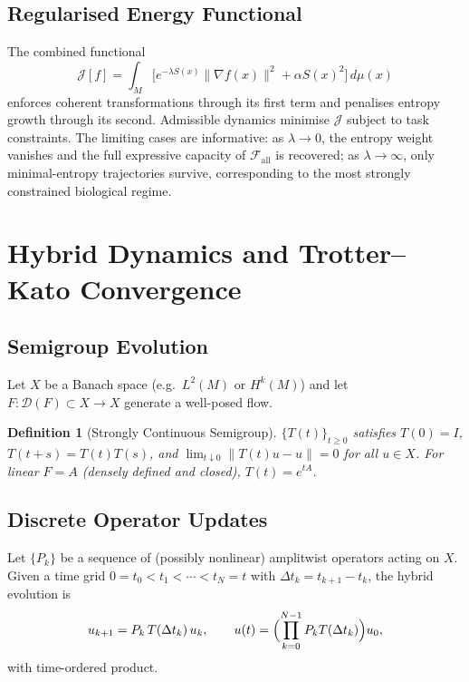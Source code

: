 \documentclass[12pt, a4paper]{article}
\newtheorem{definition}[theorem]{Definition}
\theoremstyle{remark}
\theoremstyle{definition}
\begin{document}
\subsection{Regularised Energy Functional}

The combined functional
\[
\mathcal{J}[f]
= \int_M \bigl[e^{-\lambda S(x)}\|\nabla f(x)\|^2
+ \alpha S(x)^2\bigr]\,d\mu(x)
\]
enforces coherent transformations through its first term and penalises entropy growth
through its second.  Admissible dynamics minimise $\mathcal{J}$ subject to task
constraints.  The limiting cases are informative: as $\lambda \to 0$, the entropy weight
vanishes and the full expressive capacity of $\mathcal{F}_{\mathrm{all}}$ is recovered;
as $\lambda \to \infty$, only minimal-entropy trajectories survive, corresponding to the
most strongly constrained biological regime.

\section{Hybrid Dynamics and Trotter--Kato Convergence}
\label{app:hybrid}

\subsection{Semigroup Evolution}

Let $X$ be a Banach space (e.g.\ $L^2(M)$ or $H^k(M)$) and let $F\colon\mathcal{D}(F)
\subset X \to X$ generate a well-posed flow.

\begin{definition}[Strongly Continuous Semigroup]
$\{T(t)\}_{t\ge 0}$ satisfies $T(0) = I$, $T(t+s) = T(t)T(s)$, and
$\lim_{t\downarrow 0}\|T(t)u - u\| = 0$ for all $u \in X$.
For linear $F = A$ (densely defined and closed), $T(t) = e^{tA}$.
\end{definition}

\subsection{Discrete Operator Updates}

Let $\{P_k\}$ be a sequence of (possibly nonlinear) amplitwist operators acting on $X$.
Given a time grid $0 = t_0 < t_1 < \cdots < t_N = t$ with $\Delta t_k = t_{k+1} - t_k$,
the hybrid evolution is
\[
u_{k+1} = P_k\,T(\Delta t_k)\,u_k, \qquad
u(t) = \Bigl(\prod_{k=0}^{N-1} P_k T(\Delta t_k)\Bigr)u_0,
\]
with time-ordered product.
\end{document}
